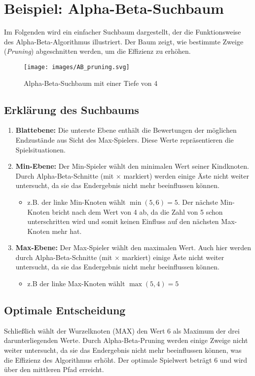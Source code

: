 \section*{Beispiel: Alpha-Beta-Suchbaum}

Im Folgenden wird ein einfacher Suchbaum dargestellt, der die Funktionsweise des Alpha-Beta-Algorithmus illustriert. Der Baum zeigt, wie bestimmte Zweige (\textit{Pruning}) abgeschnitten werden, um die Effizienz zu erhöhen.

\begin{figure}[H]
	\centering
	\texttt{[image: images/AB\_pruning.svg]}
	\caption[Alpha-Beta-Suchbaum: \cite{Wikipedia:AlphaBeta}]{Alpha-Beta-Suchbaum mit einer Tiefe von 4}
	\label{fig:abpruning}
\end{figure}

\subsection*{Erklärung des Suchbaums}

\begin{enumerate} \item \textbf{Blattebene:} Die unterste Ebene enthält die Bewertungen der möglichen Endzustände aus Sicht des Max-Spielers. Diese Werte repräsentieren die Spielsituationen.
	\item \textbf{Min-Ebene:} Der Min-Spieler wählt den minimalen Wert seiner Kindknoten. Durch Alpha-Beta-Schnitte (mit $\times$ markiert) werden einige Äste nicht weiter untersucht, da sie das Endergebnis nicht mehr beeinflussen können. \begin{itemize} \item z.B. der linke Min-Knoten wählt $\min(5, 6) = 5$. Der nächste Min-Knoten bricht nach dem Wert von 4 ab, da die Zahl von 5 schon unterschritten wird und somit keinen Einfluss auf den nächsten Max-Knoten mehr hat.
	\end{itemize}
	\item \textbf{Max-Ebene:} Der Max-Spieler wählt den maximalen Wert. Auch hier werden durch Alpha-Beta-Schnitte (mit $\times$ markiert) einige Äste nicht weiter untersucht, da sie das Endergebnis nicht mehr beeinflussen können. 
	\begin{itemize} \item z.B der linke Max-Knoten wählt $\max(5, 4) = 5$  
	\end{itemize}
\end{enumerate}

\subsection*{Optimale Entscheidung}
Schließlich wählt der Wurzelknoten (MAX) den Wert 6 als Maximum der drei darunterliegenden Werte. Durch Alpha-Beta-Pruning werden einige Zweige nicht weiter untersucht, da sie das Endergebnis nicht mehr beeinflussen können, was die Effizienz des Algorithmus erhöht. Der optimale Spielwert beträgt 6 und wird über den mittleren Pfad erreicht.

